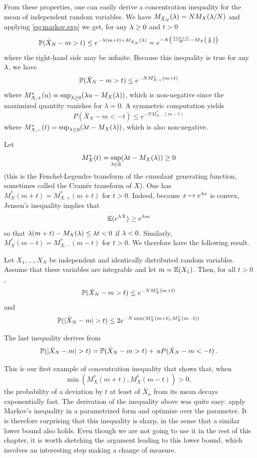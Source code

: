 From these properties, one can easily derive a concentration inequality for the mean of independent random variables. 
We have $M_{\bar X_N}(\lambda) = N M_X(\lambda/N)$ and applying \eqref{eq:markov.exp} we get, for any $\lambda \geq 0$ and $t>0$
\[
\bm{\mathbb P}(\bar X_N - m > t) \leq e^{-\lambda(m+t) + M_{\bar X_N}(\lambda)} = e^{-N \left(\frac{\lambda(m+t)}N - M_X\left(\frac{\lambda}N\right)\right)}
\]
where the right-hand side may be infinite. Because this inequality is true for any $\lambda$, we have
\[
\bm{\mathbb P}(\bar X_N - m > t) \leq e^{-N M_{X,+}^*(m+t)}
\]
where $M_{X,+}^*(u) = \sup_{\lambda\geq 0} (\lambda u - M_X(\lambda))$, which is non-negative since the maximized quantity vanishes for $\lambda=0$. A symmetric computation yields   
\[
P(\bar X_N - m < -t) \leq e^{-N M_{X,-}^*(m-t)}
\]
where $M_{X,-}^*(t) = \sup_{\lambda\leq 0} (\lambda t - M_X(\lambda))$, which is also non-negative. 

Let 
\begin{equation}
\label{eq:cramer}
M_X^*(t) = \sup_{\lambda\in {\mathbb{R}}} (\lambda t - M_X(\lambda)) \geq 0
\end{equation}
(this is the Fenchel-Legendre transform of the cumulant generating function, sometimes called the Cram\'er transform of $X$). One  has $M_X^*(m+t) = M^*_{X,+}(m+t)$ for $t>0$. Indeed, because $x\mapsto e^{\lambda x}$ is convex, Jensen's inequality implies that 
\[
\bm{\mathbb E}(e^{\lambda X}) \geq e^{\lambda m}
\]
so that $\lambda (m+t) - M_X(\lambda) \leq \lambda t < 0$ if $\lambda<0$.  Similarly,  $M_X^*(m-t) = M^*_{X,-}(m-t)$ for $t >0$. We therefore have the following result.
\begin{theorem}
\label{th:cramer.inf}
Let $X_1, \ldots, X_N$ be independent and identically distributed random variables. Assume that these variables are integrable and let $m = \bm{\mathbb E}(X_1)$. Then, for all $t>0$,
\[
\bm{\mathbb P}(\bar X_N - m > t) \leq e^{-N M_{X}^*(m+t)}
\]
and
\[
\bm{\mathbb P}(|\bar X_N - m| > t) \leq 2e^{-N \min(M_X^*(m+t), M_X^*(m-t))}
\]
\end{theorem}
The last inequality derives from
\[
\bm{\mathbb P}(|\bar X_N - m| > t)  = \bm{\mathbb P}(\bar X_N - m > t) + \,uP(\bar X_N - m < -t)\,.
\]

This is our first example of concentration inequality that shows that, when 
\[
\min(M_X^*(m+t), M_X^*(m-t))>0,
\]
 the probability of a deviation by $t$ at least of $\bar X_n$ from its mean decays exponentially fast.  The derivation of the inequality above was quite easy: apply Markov's inequality in a parametrized form and optimize over the parameter. It is therefore surprising that this inequality is sharp, in the sense that a similar lower bound also holds. Even though we are not going to use it in the rest of this chapter, it is worth sketching the argument leading to this lower bound, which involves an interesting step making a change of measure. 

